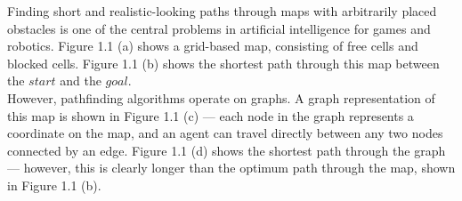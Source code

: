 \documentclass[12pt,notitlepage]{report}
\begin{document}
Finding short and realistic-looking paths through maps with arbitrarily placed obstacles is one of the central problems in artificial intelligence for games and robotics. Figure 1.1 (a) shows a grid-based map, consisting of free cells and blocked cells. Figure 1.1 (b) shows the shortest path through this map between the $start$ and the $goal$.\\

\noindent
However, pathfinding algorithms operate on graphs. A graph representation of this map is shown in Figure 1.1 (c) --- each node in the graph represents a coordinate on the map, and an agent can travel directly between any two nodes connected by an edge. Figure 1.1 (d) shows the shortest path through the graph --- however, this is clearly longer than the optimum path through the map, shown in Figure 1.1 (b).\\
\end{document}
